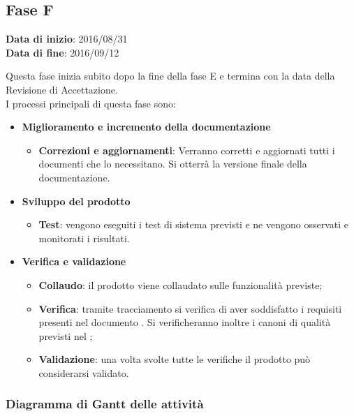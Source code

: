 	\subsection{Fase F}
	\begin{center}
		\textbf{Data di inizio}: 2016/08/31 \\
		\textbf{Data di fine}: 2016/09/12 \\
	\end{center}
	Questa fase inizia subito dopo la fine della fase E e termina con la data della Revisione di Accettazione. \\
	I processi principali di questa fase sono:
		\begin{itemize}
			\item \textbf{Miglioramento e incremento della documentazione}
			\att
			\begin{itemize}
				\item \textbf{Correzioni e aggiornamenti}: Verranno corretti e aggiornati tutti i documenti che lo necessitano. Si otterrà la versione finale della documentazione. 
			\end{itemize}
			\item \textbf{Sviluppo del prodotto}
			\att
				\begin{itemize}
					\item \textbf{Test}: vengono eseguiti i test di sistema previsti e ne vengono osservati e monitorati i risultati. 
				\end{itemize}
			\item \textbf{Verifica e validazione}
			\att
			\begin{itemize}
				\item \textbf{Collaudo}: il prodotto viene collaudato sulle funzionalità previste;
				\item \textbf{Verifica}: tramite tracciamento si verifica di aver soddisfatto i requisiti presenti nel documento \ARdoc. Si verificheranno inoltre i canoni di qualità previsti nel \PQdoc;
				\item \textbf{Validazione}: una volta svolte tutte le verifiche il prodotto può considerarsi validato.
			\end{itemize}
		\end{itemize}
		\subsubsection{Diagramma di Gantt delle attività}
		
